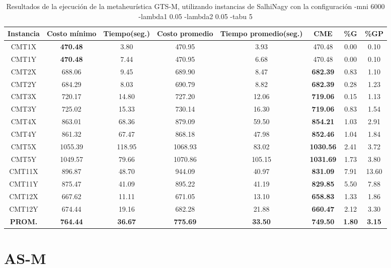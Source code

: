 \begin{table}[h]
\caption{Resultados de la ejecución de la metaheurística GTS-M, utilizando instancias de SalhiNagy con la configuración -mni 6000 -lambda1 0.05 -lambda2 0.05 -tabu 5}
\centering
\small
\begin{tabular}{c c c c c c c c}
\hline\hline
Instancia & Costo mínimo & Tiempo(seg.) & Costo promedio & Tiempo promedio(seg.) & CME & \%G & \%GP \\ [0.5ex]
\hline
CMT1X & \bf{470.48} & 3.80 & 
470.95 & 3.93 & 470.48 & 0.00
 & 0.10\\CMT1Y & \bf{470.48} & 7.44 & 
470.95 & 6.68 & 470.48 & 0.00
 & 0.10\\CMT2X & 688.06 & 9.45 & 
689.90 & 8.47 & \bf{682.39} & 
0.83 & 1.10\\CMT2Y & 684.29 & 8.03 & 
690.79 & 8.82 & \bf{682.39} & 
0.28 & 1.23\\CMT3X & 720.17 & 14.80 & 
727.20 & 12.06 & \bf{719.06} & 
0.15 & 1.13\\CMT3Y & 725.02 & 15.33 & 
730.14 & 16.30 & \bf{719.06} & 
0.83 & 1.54\\CMT4X & 863.01 & 68.36 & 
879.09 & 59.50 & \bf{854.21} & 
1.03 & 2.91\\CMT4Y & 861.32 & 67.47 & 
868.18 & 47.98 & \bf{852.46} & 
1.04 & 1.84\\CMT5X & 1055.39 & 118.95 & 
1068.93 & 83.02 & \bf{1030.56} & 
2.41 & 3.72\\CMT5Y & 1049.57 & 79.66 & 
1070.86 & 105.15 & \bf{1031.69} & 
1.73 & 3.80\\CMT11X & 896.87 & 48.70 & 
944.09 & 40.97 & \bf{831.09} & 
7.91 & 13.60\\CMT11Y & 875.47 & 41.09 & 
895.22 & 41.19 & \bf{829.85} & 
5.50 & 7.88\\CMT12X & 667.62 & 11.11 & 
671.05 & 13.10 & \bf{658.83} & 
1.33 & 1.86\\CMT12Y & 674.44 & 19.16 & 
682.28 & 21.88 & \bf{660.47} & 
2.12 & 3.30\\\bf{PROM.} & 
\bf{764.44} & \bf{36.67} & \bf{775.69} & \bf{33.50} & \bf{749.50} & \bf{1.80} & \bf{3.15}\\[1ex]\hline
\end{tabular}
\label{table:GTS-M-salhinagy-6000-5}
\end{table}

\clearpage
\section{AS-M}\label{tablas-entonacion-AS-M}

